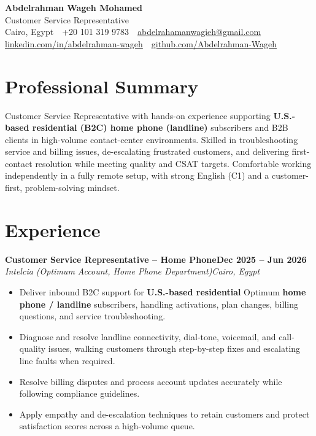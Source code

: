 \documentclass[11pt,a4paper]{article}
\newcommand{\role}[4]{%
  \vspace{1pt}%
  \noindent\textbf{#1}\hfill\textbf{#2}\\[0.5pt]%
  \textit{#3}\hfill\textit{#4}\par\vspace{1pt}%
}
\begin{document}
\begin{center}
  {\LARGE\bfseries Abdelrahman Wageh Mohamed}\\[3pt]
  {\normalsize Customer Service Representative}\\[4pt]
  \small
  Cairo, Egypt \,\textbar\, +20 101 319 9783 \,\textbar\,
  \href{mailto:abdelrahamanwagieh@gmail.com}{abdelrahamanwagieh@gmail.com}\\[1pt]
  \href{https://www.linkedin.com/in/abdelrahman-wageh-036503365/}{linkedin.com/in/abdelrahman-wageh}
  \,\textbar\,
  \href{https://github.com/Abdelrahman-Wageh}{github.com/Abdelrahman-Wageh}
\end{center}

\section{Professional Summary}
Customer Service Representative with hands-on experience supporting
\textbf{U.S.-based residential (B2C) home phone (landline)} subscribers and
B2B clients in high-volume contact-center environments. Skilled in troubleshooting service and billing
issues, de-escalating frustrated customers, and delivering first-contact
resolution while meeting quality and CSAT targets. Comfortable working
independently in a fully remote setup, with strong English (C1) and a
customer-first, problem-solving mindset.

\section{Experience}

\role{Customer Service Representative -- Home Phone}{Dec 2025 -- Jun 2026}{Intelcia (Optimum Account, Home Phone Department)}{Cairo, Egypt}
\begin{itemize}
  \item Deliver inbound B2C support for \textbf{U.S.-based residential} Optimum \textbf{home phone / landline} subscribers, handling activations, plan changes, billing questions, and service troubleshooting.
  \item Diagnose and resolve landline connectivity, dial-tone, voicemail, and call-quality issues, walking customers through step-by-step fixes and escalating line faults when required.
  \item Resolve billing disputes and process account updates accurately while following compliance guidelines.
  \item Apply empathy and de-escalation techniques to retain customers and protect satisfaction scores across a high-volume queue.
\end{itemize}
\end{document}
